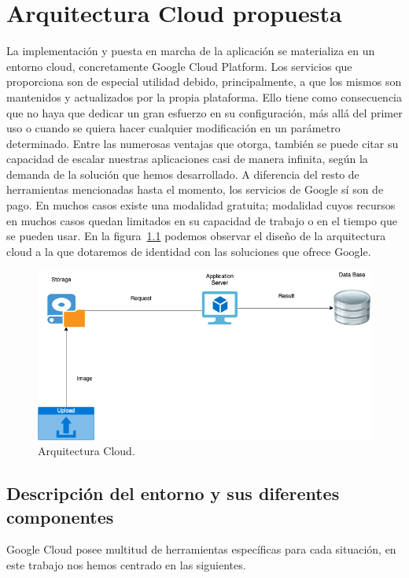\cleardoublepage
\mbox{}

\lstset{
language=Python,
basicstyle=\small\sffamily,
numbers=left,
numberstyle=\tiny,
frame=tb,
columns=fullflexible,
showstringspaces=false
}
\chapter{Arquitectura Cloud propuesta}
\label{ch:chapter4}
La implementación y puesta en marcha de la aplicación se materializa en un entorno cloud, concretamente Google Cloud Platform.
Los servicios que proporciona son de especial utilidad debido, principalmente, a que los mismos son mantenidos y actualizados por la propia plataforma.
Ello tiene como consecuencia que no haya que dedicar un gran esfuerzo en su configuración, más allá del primer uso o cuando se quiera hacer cualquier modificación en un parámetro determinado.
Entre las numerosas ventajas que otorga, también se puede citar su capacidad de escalar nuestras aplicaciones casi de manera infinita, según la demanda de la solución que hemos desarrollado.
A diferencia del resto de herramientas mencionadas hasta el momento, los servicios de Google sí son de pago.
En muchos casos existe una modalidad gratuita;
modalidad cuyos recursos en muchos casos quedan limitados en su capacidad de trabajo o en el tiempo que se pueden usar.
En la figura~\ref{fig:Arquitectura Cloud} podemos observar el diseño de la arquitectura cloud a la que dotaremos de identidad con las soluciones que ofrece Google.

\begin{figure}
    \centering
    \includegraphics[width=1.0\textwidth]{images/chapter4/cloud_architecture.png}
    \caption{Arquitectura Cloud.}
    \label{fig:Arquitectura Cloud}
\end{figure}

\section{Descripción del entorno y sus diferentes componentes}\label{sec:descripción-del-entorno-y-sus-diferentes-componentes}
Google Cloud posee multitud de herramientas específicas para cada situación, en este trabajo nos hemos centrado en las siguientes.

